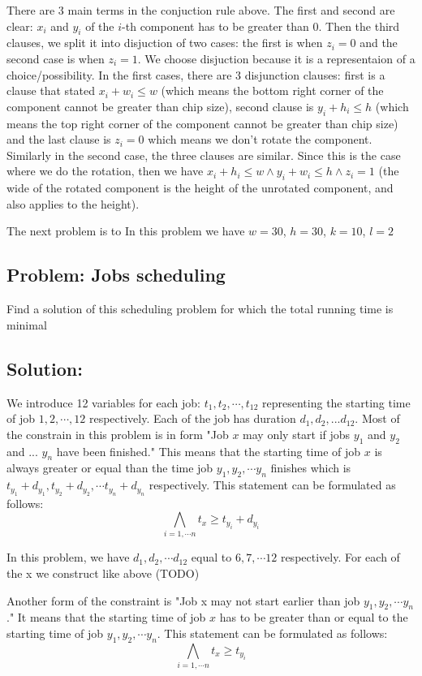 \documentclass[12pt]{article}
\begin{document}
There are 3 main terms in the conjuction rule above. The first and second are clear: $x_i$ and $y_i$ of the $i$-th component has to be greater than 0. Then the third clauses, we split it into disjuction of two cases: the first is when $z_i=0$ and the second case is when $z_i=1$. We choose disjuction because it is a representaion of a choice/possibility. In the first cases, there are 3 disjunction clauses: first is a clause that stated $x_i+w_i \leq w$ (which means the bottom right corner of the component cannot be greater than chip size), second clause is $y_i+h_i \leq h$ (which means the top right corner of the component cannot be greater than chip size) and the last clause is $z_i=0$ which means we don't rotate the component. Similarly in the second case, the three clauses are similar. Since this is the case where we do the rotation, then we have $x_i+h_i \leq w \wedge y_i+w_i \leq h \wedge z_i=1$ (the wide of the rotated component is the height of the unrotated component, and also applies to the height).

The next problem is to 
In this problem we have $w=30$, $h=30$, $k=10$, $l=2$

\subsection*{Problem: Jobs scheduling}
Find a solution of this scheduling problem for which the total running time is minimal

\subsection*{Solution:}
We introduce 12 variables for each job: $t_1, t_2, \cdots , t_{12}$ representing the starting time of job $1, 2, \cdots, 12$ respectively. Each of the job has duration $d_1, d_2, ... d_{12}$. Most of the constrain in this problem is in form "Job $x$ may only start if jobs $y_1$ and $y_2$ and ... $y_n$ have been finished." This means that the starting time of job $x$ is always greater or equal than the time job $y_1, y_2, \cdots y_n$ finishes which is $t_{y_1}+d_{y_1}, t_{y_2}+d_{y_2}, \cdots t_{y_n}+d_{y_n}$ respectively. This statement can be formulated as follows:
\[ \bigwedge_{i=1,\cdots n} t_x \geq t_{y_i}+d_{y_i} \]

In this problem, we have $d_1, d_2, \cdots d_{12}$ equal to $6, 7, \cdots 12$ respectively. For each of the x we construct like above (TODO)

Another form of the constraint is "Job x may not start earlier than job $y_1, y_2, \cdots y_n$." It means that the starting time of job $x$ has to be greater than or equal to the starting time of job $y_1, y_2, \cdots y_n$. This statement can be formulated as follows:
\[ \bigwedge_{i=1,\cdots n} t_x \geq t_{y_i} \]
\end{document}
